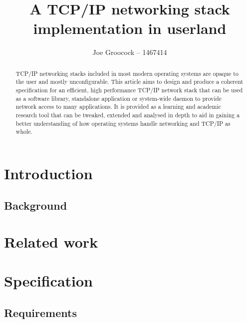 \documentclass[11pt,a4paper,british,twocolumn]{bhamarticle}
\title{A TCP/IP networking stack implementation in userland}
\author{Joe Groocock -- 1467414} %
\begin{document}
\maketitle

\tableofcontents

\begin{abstract}
    TCP/IP networking stacks included in most modern operating systems are opaque to the user and mostly unconfigurable. This article aims to design and produce a coherent specification for an efficient, high performance TCP/IP network stack that can be used as a software library, standalone application or system-wide daemon to provide network access to many applications. It is provided as a learning and academic research tool that can be tweaked, extended and analysed in depth to aid in gaining a better understanding of how operating systems handle networking and TCP/IP as whole.
\end{abstract}

\section{Introduction}

    \subsection{Background}


\section{Related work}
    

\section{Specification}
    \subsection{Requirements}
\end{document}
